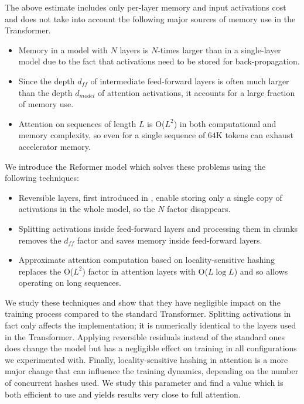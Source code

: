 The above estimate includes only per-layer memory and input activations cost and does not take into account the following major sources of memory use in the Transformer.

\begin{itemize}
\item Memory in a model with $N$ layers is $N$-times larger than in a single-layer model due to the fact that activations need to be stored for back-propagation.
\item Since the depth $d_{ff}$ of intermediate feed-forward layers is often much larger than the depth $d_{model}$ of attention activations, it accounts for a large fraction of memory use.
\item Attention on sequences of length $L$ is O($L^2$) in both computational and memory complexity, so even for a single sequence of $64$K tokens can exhaust accelerator memory.
\end{itemize}

We introduce the Reformer model which solves these problems using the following techniques:

\begin{itemize}
\item Reversible layers, first introduced in \cite{gomez2017reversible}, enable storing only a single copy of activations in the whole model, so the $N$ factor disappears.
\item Splitting activations inside feed-forward layers and processing them in chunks removes the $d_{ff}$ factor and saves memory inside feed-forward layers.
\item Approximate attention computation based on locality-sensitive hashing replaces the O($L^2$) factor in attention layers with O($L\log L$) and so allows operating on long sequences.
\end{itemize}

We study these techniques and show that they have negligible impact on the training process compared to the standard Transformer. Splitting activations in fact only affects the implementation; it is numerically identical to the layers used in the Transformer. Applying reversible residuals instead of the standard ones does change the model but has a negligible effect on training in all configurations we experimented with.  Finally, locality-sensitive hashing in attention is a more major change that can influence the training dynamics, depending on the number of concurrent hashes used.  We study this parameter and find a value which is both efficient to use and yields results very close to full attention.

